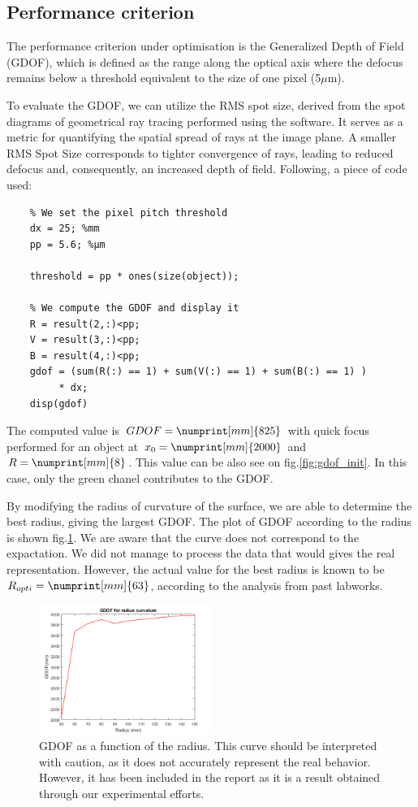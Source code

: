 \documentclass[10pt,letterpaper]{article}
\begin{document}
\subsection{Performance criterion}
The performance criterion under optimisation is the Generalized Depth of Field (GDOF), which is defined as the range along the optical axis where the defocus remains below a threshold equivalent to the size of one pixel (5$\mu$m).

To evaluate the GDOF, we can utilize the RMS spot size, derived from the spot diagrams of geometrical ray tracing performed using the software. It serves as a metric for quantifying the spatial spread of rays at the image plane. A smaller RMS Spot Size corresponds to tighter convergence of rays, leading to reduced defocus and, consequently, an increased depth of field.
Following, a piece of code used:

\begin{verbatim}
    % We set the pixel pitch threshold
    dx = 25; %mm
    pp = 5.6; %µm
    
    threshold = pp * ones(size(object));

    % We compute the GDOF and display it
    R = result(2,:)<pp;
    V = result(3,:)<pp;
    B = result(4,:)<pp;
    gdof = (sum(R(:) == 1) + sum(V(:) == 1) + sum(B(:) == 1) )
         * dx;
    disp(gdof)
\end{verbatim}

The computed value is $GDOF = \numprint[mm]{825}$ with quick focus performed for an object at $x_0 = \numprint[mm]{2000}$ and $R= \numprint[mm]{8}$. This value can be also see on fig.\ref{fig:gdof_init}. In this case, only the green chanel contributes to the GDOF.



By modifying the radius of curvature of the surface, we are able to determine the best radius, giving the largest GDOF. The plot of GDOF according to the radius is shown fig.\ref{fig:gdof_opti}. We are aware that the curve does not correspond to the expactation. We did not manage to process the data that would gives the real representation. However, the actual value for the best radius is known to be $R_{opti}=\numprint[mm]{63}$, according to the analysis from past labworks.

\begin{figure}[h]
    \centering
    \includegraphics[width=0.5\textwidth]{IO25_TP4_optim_R_QF_2000.png}
    \caption{GDOF as a function of the radius. This curve should be interpreted with caution, as it does not accurately represent the real behavior. However, it has been included in the report as it is a result obtained through our experimental efforts.}
    \label{fig:gdof_opti}
\end{figure}
\end{document}
